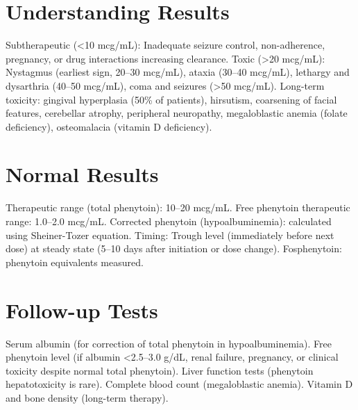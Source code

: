 \section*{Understanding Results}
Subtherapeutic (<10 mcg/mL): Inadequate seizure control, non-adherence, pregnancy, or drug interactions increasing clearance. Toxic (>20 mcg/mL): Nystagmus (earliest sign, 20--30 mcg/mL), ataxia (30--40 mcg/mL), lethargy and dysarthria (40--50 mcg/mL), coma and seizures (>50 mcg/mL). Long-term toxicity: gingival hyperplasia (50\% of patients), hirsutism, coarsening of facial features, cerebellar atrophy, peripheral neuropathy, megaloblastic anemia (folate deficiency), osteomalacia (vitamin D deficiency).

\section*{Normal Results}
Therapeutic range (total phenytoin): 10--20 mcg/mL. Free phenytoin therapeutic range: 1.0--2.0 mcg/mL. Corrected phenytoin (hypoalbuminemia): calculated using Sheiner-Tozer equation. Timing: Trough level (immediately before next dose) at steady state (5--10 days after initiation or dose change). Fosphenytoin: phenytoin equivalents measured.

\section*{Follow-up Tests}
Serum albumin (for correction of total phenytoin in hypoalbuminemia). Free phenytoin level (if albumin <2.5--3.0 g/dL, renal failure, pregnancy, or clinical toxicity despite normal total phenytoin). Liver function tests (phenytoin hepatotoxicity is rare). Complete blood count (megaloblastic anemia). Vitamin D and bone density (long-term therapy).

